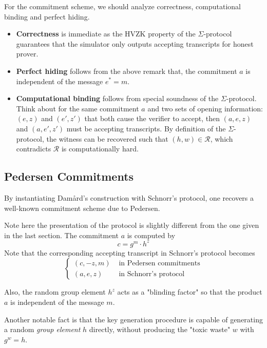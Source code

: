 \documentclass{article}
\begin{document}
For the commitment scheme, we should analyze correctness, computational binding and perfect hiding. 
\begin{itemize}
\item \textbf{Correctness} is immediate as the HVZK property of the $\Sigma$-protocol guarantees that the simulator only outputs accepting transcripts for honest prover.  
\item \textbf{Perfect hiding} follows from the above remark that, the commitment $a$ is independent of the message $e^{\displaystyle *} = m$. 
\item \textbf{Computational binding} follows from special soundness of the $\Sigma$-protocol. Think about for the same commitment $a$ and two sets of opening information: $(e, z)$ and $(e', z')$ that both cause the verifier to accept, then $(a, e, z)$ and $(a, e', z')$ must be accepting transcripts. By definition of the $\Sigma$-protocol, the witness can be recovered such that $(h, w) \in \mathcal{R}$, which contradicts $\mathcal{R}$ is computationally hard. 
\end{itemize}

\subsection{Pedersen Commitments}

By instantiating Dam\aa rd's construction with Schnorr's protocol, one recovers a well-known commitment scheme due to Pedersen. 

Note here the presentation of the protocol is slightly different from the one given in the last section. The commitment $a$ is computed by
\begin{equation*}
c = g^m \cdot h^z
\end{equation*}
Note that the corresponding accepting transcript in Schnorr's protocol becomes
\begin{equation*}
\begin{cases}
(c, -z, m)   &\text{ in Pedersen commitments} \\
 (a, e,  z)  &\text{ in Schnorr's protocol}
\end{cases}
\end{equation*}

Also, the random group element $h^z$ acts as a "blinding factor" so that the product $a$ is independent of the message $m$.

Another notable fact is that the key generation procedure is capable of generating a random \textit{group element} $h$ directly, without producing the "toxic waste" $w$ with $g^w = h$. 
\end{document}
